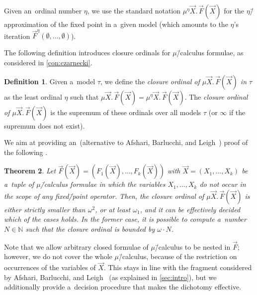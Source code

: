 \documentclass[11pt,a4paper]{amsart}
\theoremstyle{plain}
\newtheorem{thm}{Theorem}[section]
\theoremstyle{definition}
\newtheorem{defi}[thm]{Definition}
\theoremstyle{defC}
\theoremstyle{thmC}
\theoremstyle{plain}
\numberwithin{equation}{section}
\numberwithin{equation}{section}
\numberwithin{figure}{section}
\newcommand{\domain}[1]{\ensuremath{\mathbb{#1}}\xspace}
\newcommand{\N}{\domain{N}}
\begin{document}
Given an~ordinal number $\eta$, we use the standard notation $\mu^\eta \vec{X}.\,\vec{F}(\vec{X})$ for the $\eta$\=/approximation of the fixed point in a~given model
(which amounts to the $\eta$'s iteration $\vec{F}^{\eta}(\emptyset,\dots,\emptyset)$).

The following definition introduces closure ordinals for $\mu$\=/calculus formulae, as considered in \cref{con:czarnecki}.

\begin{defi}
	Given a~model $\tau$, we define the \emph{closure ordinal of $\mu \vec{X}.\, \vec{F}(\vec{X})$ in $\tau$} as the least ordinal $\eta$ such that $\mu \vec{X}.\,\vec{F}(\vec{X}) = \mu^\eta \vec{X}.\,\vec{F}(\vec{X})$.
	The \emph{closure ordinal of $\mu \vec{X}.\,\vec{F}(\vec{X})$} is the supremum of these ordinals over all models $\tau$ (or $\infty$ if the supremum does not exist).
\end{defi}

We aim at providing an~(alternative to Afshari, Barlucchi, and Leigh~\cite{afshari_limit_fics}) proof of the following .

\begin{thm}\label{thm:closure-mu}
	Let $\vec{F}(\vec{X})=(F_1(\vec{X}),\dots,F_k(\vec{X}))$ with $\vec{X}=(X_1,\dots,X_k)$ be a~tuple of $\mu$\=/calculus formulae in which the variables $X_1,\dots,X_k$ do not occur in the scope of any fixed\=/point operator.
	Then, the closure ordinal of $\mu \vec{X}.\,\vec{F}(\vec{X})$ is either strictly smaller than $\omega^2$, or at least $\omega_1$, and it can be effectively decided which of the cases holds.
	In the former case, it is possible to compute a~number $N\in\N$ such that the closure ordinal is bounded by $\omega\cdot N$.
\end{thm}
\noindent %
Note that we allow arbitrary closed formulae of $\mu$\=/calculus to be nested in $\vec{F}$;
however, we do not cover the whole $\mu$\=/calculus, because of the restriction on occurrences of the variables of $\vec{X}$.
This stays in line with the fragment considered by Afshari, Barlucchi,
and Leigh~\cite{afshari_limit_fics} (as explained in \cref{sec:intro}),
but we additionally provide a~decision procedure that makes the
dichotomy effective.
\end{document}
